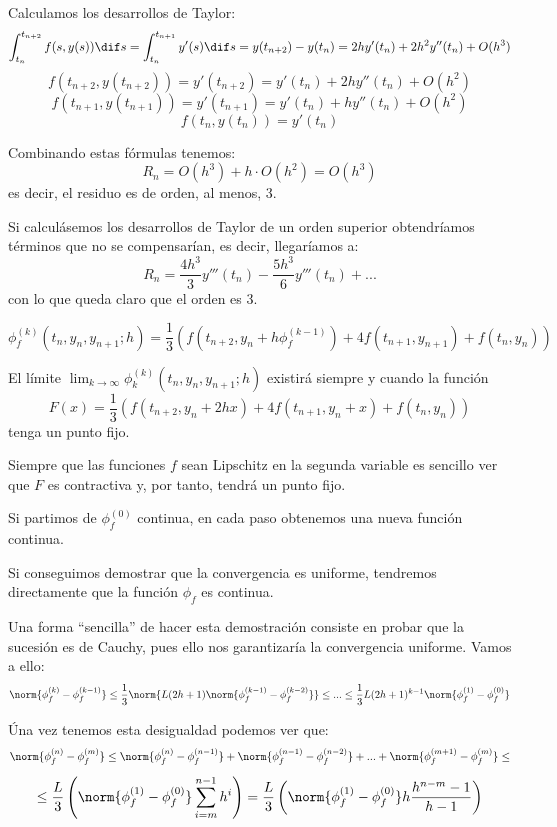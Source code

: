 \begin{problem}[4]
\spart
{}

Calculamos los desarrollos de Taylor:
\[\int_{t_n}^{t_{n+2}}f(s,y(s))\dif s = \int_{t_n}^{t_{n+1}}y'(s)\dif s = y(t_{n+2})-y(t_n) = 2hy'(t_n)+2h^2y''(t_n) +O(h^3)\]
\[f(t_{n+2},y(t_{n+2})) = y'(t_{n+2}) = y'(t_n)+2hy''(t_n)+O(h^2)\]
\[f(t_{n+1},y(t_{n+1})) = y'(t_{n+1}) = y'(t_n)+hy''(t_n)+O(h^2)\]
\[f(t_n,y(t_n)) = y'(t_n)\]

Combinando estas fórmulas tenemos:
\[R_n = O(h^3)+h\cdot O(h^2) = O(h^3)\]
es decir, el residuo es de orden, al menos, 3.

Si calculásemos los desarrollos de Taylor de un orden superior obtendríamos términos que no se compensarían, es decir, llegaríamos a:
\[R_n = \frac{4h^3}{3}y'''(t_n) - \frac{5h^3}{6}y'''(t_n)+...\]
con lo que queda claro que el orden es 3.

\spart


\[\phi_f^{(k)}(t_n,y_n,y_{n+1};h) = \frac{1}{3}\left(f(t_{n+2},y_n+h\phi^{(k-1)}_f)+4f(t_{n+1},y_{n+1})+f(t_n,y_n) \right)\]

El límite $\lim_{k\to \infty}\phi_k^{(k)}(t_n,y_n,y_{n+1};h)$ existirá siempre y cuando la función
\[F(x)=\frac{1}{3}\left(f(t_{n+2},y_n+2hx)+4f(t_{n+1},y_n+x)+f(t_n,y_n) \right)\]
tenga un punto fijo.

Siempre que las funciones $f$ sean Lipschitz en la segunda variable es sencillo ver que $F$ es contractiva y, por tanto, tendrá un punto fijo.

\spart
{}

Si partimos de $\phi_f^{(0)}$ continua, en cada paso obtenemos una nueva función continua.

Si conseguimos demostrar que la convergencia es uniforme, tendremos directamente que la función $\phi_f$ es continua.

Una forma ``sencilla'' de hacer esta demostración consiste en probar que la sucesión es de Cauchy, pues ello nos garantizaría la convergencia uniforme. Vamos a ello:
\[\norm{\phi_f^{(k)}-\phi_f^{(k-1)}} \leq \frac{1}{3}\norm{L(2h+1)\norm{\phi_f^{(k-1)}-\phi_f^{(k-2)}}} \leq ... \leq \frac{1}{3}L(2h+1)^{k-1}\norm{\phi_f^{(1)}-\phi_f^{(0)}}\]

Úna vez tenemos esta desigualdad podemos ver que:
\[\norm{\phi_f^{(n)}-\phi_f^{(m)}} \leq \norm{\phi_f^{(n)}-\phi_f^{(n-1)}} + \norm{\phi_f^{(n-1)}-\phi_f^{(n-2)}} + ... + \norm{\phi_f^{(m+1)}-\phi_f^{(m)}} \leq\]
\[\leq \frac{L}{3}\left(\norm{\phi_f^{(1)}-\phi_f^{(0)}}\sum_{i=m}^{n-1}h^i \right) = \frac{L}{3}\left(\norm{\phi_f^{(1)}-\phi_f^{(0)}}h\frac{h^{n-m}-1}{h-1} \right)  \]


\end{problem}
